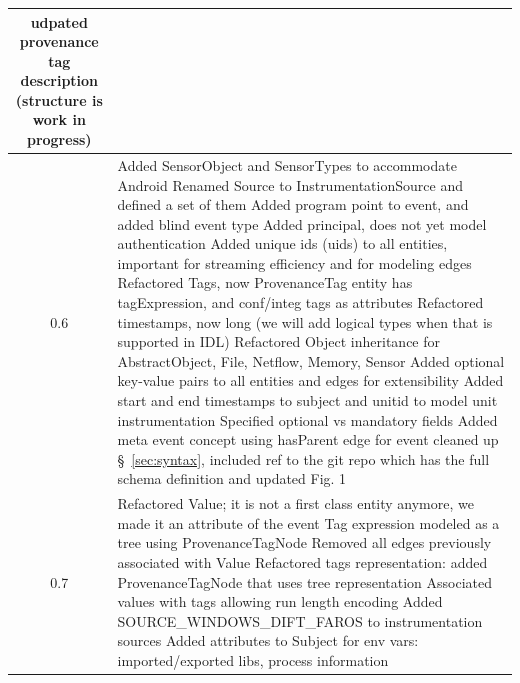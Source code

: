 \documentclass[10pt, conference, onecolumn]{IEEEtran}
\begin{document}
\begin{longtable}{|c|p{17cm}|}
        udpated provenance tag description (structure is work in progress)
\\\hline
0.6 &  \small
  Added SensorObject and SensorTypes to accommodate Android  \newline
  Renamed Source to InstrumentationSource and defined a set of them  \newline
  Added program point to event, and added blind event type  \newline
  Added principal, does not yet model authentication  \newline
  Added unique ids (uids) to all entities, important for streaming efficiency and for modeling edges  \newline
  Refactored Tags, now ProvenanceTag entity has tagExpression, and conf/integ tags as attributes  \newline
  Refactored timestamps, now long (we will add logical types when that is supported in IDL)  \newline
  Refactored Object inheritance for AbstractObject, File, Netflow, Memory, Sensor  \newline
  Added optional key-value pairs to all entities and edges for extensibility  \newline
  Added start and end timestamps to subject and unitid to model unit instrumentation \newline
  Specified optional vs mandatory fields \newline
  Added meta event concept using hasParent edge for event
  cleaned up  \S~\ref{sec:syntax}, included ref to the git repo which has the full schema definition and updated Fig. 1
\\\hline
0.7 &  \small
  Refactored Value; it is not a first class entity anymore, we made it an attribute of the event  \newline
  Tag expression modeled as a tree using ProvenanceTagNode  \newline
  Removed all edges previously associated with Value  \newline
  Refactored tags representation: added ProvenanceTagNode that uses tree representation  \newline
  Associated values with tags allowing run length encoding  \newline
  Added SOURCE\_WINDOWS\_DIFT\_FAROS to instrumentation sources  \newline
  Added attributes to Subject for env vars: imported/exported libs, process information  \newline

\end{longtable}
\end{document}
